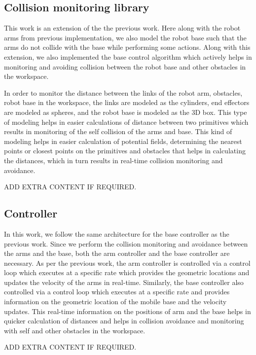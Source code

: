 \documentclass[a4paper, 11.5pt, conference]{ieeeconf}      %
\begin{document}
\subsection{Collision monitoring library}
This work is an extension of the the previous work. Here along with the robot arms from previous implementation, we also model the robot base such that the arms do not collide with the base while performing some actions. Along with this extension, we also implemented the base control algorithm which actively helps in monitoring and avoiding collision between the robot base and other obstacles in the workspace.

In order to monitor the distance between the links of the robot arm, obstacles, robot base in the workspace, the links are modeled as the cylinders, end effectors are modeled as spheres, and the robot base is modeled as the 3D box. This type of modeling helps in easier calculations of distance between two primitives which results in monitoring of the self collision of the arms and base. This kind of modeling helps in easier calculation of potential fields, determining the nearest points or closest points on the primitives and obstacles that helps in calculating the distances, which in turn results in real-time collision monitoring and avoidance.

ADD EXTRA CONTENT IF REQUIRED.

\subsection{Controller} 
In this work, we follow the same architecture for the base controller as the previous work. Since we perform the collision monitoring and avoidance between the arms and the base, both the arm controller and the base controller are necessary. As per the previous work, the arm controller is controlled via a control loop which executes at a specific rate which provides the geometric locations and updates the velocity of the arms in real-time. Similarly, the base controller also controlled via a control loop which executes at a specific rate and provides information on the geometric location of the mobile base and the velocity updates. This real-time information on the positions of arm and the base helps in quicker calculation of distances and helps in collision avoidance and monitoring with self and other obstacles in the workspace.

ADD EXTRA CONTENT IF REQUIRED. 
 
\end{document}
